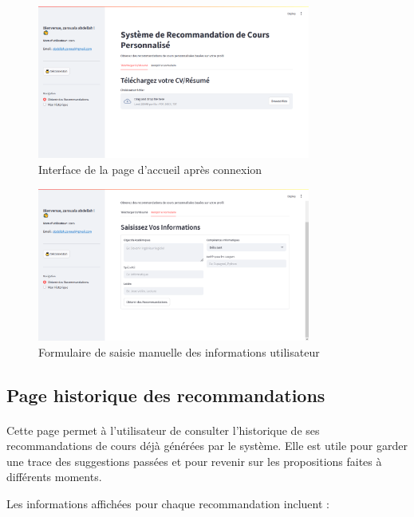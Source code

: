 \begin{center}
\begin{figure}[h]
    \centering
    \includegraphics[width=0.8\textwidth]{images/acceuil.png}
    \caption{Interface de la page d'accueil après connexion}
\end{figure}

\begin{figure}[h]
    \centering
    \includegraphics[width=0.8\textwidth]{images/formulaireCV.png}
    \caption{Formulaire de saisie manuelle des informations utilisateur}
\end{figure}
\end{center}

\noindent
\newpage
\subsection*{Page historique des recommandations}
\paragraph{}
Cette page permet à l’utilisateur de consulter l’historique de ses recommandations de cours déjà générées par le système. Elle est utile pour garder une trace des suggestions passées et pour revenir sur les propositions faites à différents moments.

\medskip
\hfill \break
\noindent Les informations affichées pour chaque recommandation incluent :

